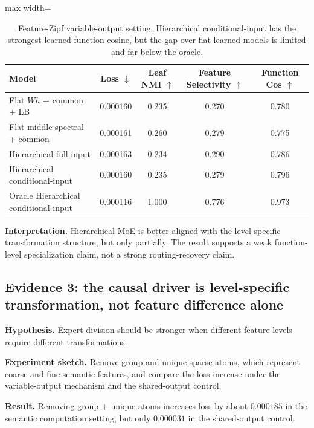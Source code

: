 \documentclass[11pt]{article}
\newcommand{\tablesize}{\footnotesize}
\begin{document}
\begin{table}[H]
\centering
\tablesize
\begin{adjustbox}{max width=\linewidth}
\begin{tabular}{lcccc}
\toprule
Model & Loss $\downarrow$ & Leaf NMI $\uparrow$ & Feature Selectivity $\uparrow$ & Function Cos $\uparrow$ \\
\midrule
Flat $Wh$ + common + LB & 0.000160 & 0.235 & 0.270 & 0.780 \\
Flat middle spectral + common & 0.000161 & 0.260 & 0.279 & 0.775 \\
Hierarchical full-input & 0.000163 & 0.234 & 0.290 & 0.786 \\
Hierarchical conditional-input & 0.000160 & 0.235 & 0.279 & 0.796 \\
Oracle Hierarchical conditional-input & 0.000116 & 1.000 & 0.776 & 0.973 \\
\bottomrule
\end{tabular}
\end{adjustbox}
\caption{Feature-Zipf variable-output setting. Hierarchical conditional-input has the strongest learned function cosine, but the gap over flat learned models is limited and far below the oracle.}
\end{table}

\textbf{Interpretation.} Hierarchical MoE is better aligned with the level-specific transformation structure, but only partially. The result supports a weak function-level specialization claim, not a strong routing-recovery claim.

\subsection{Evidence 3: the causal driver is level-specific transformation, not feature difference alone}

\textbf{Hypothesis.} Expert division should be stronger when different feature levels require different transformations.

\textbf{Experiment sketch.} Remove group and unique sparse atoms, which represent coarse and fine semantic features, and compare the loss increase under the variable-output mechanism and the shared-output control.

\textbf{Result.} Removing group + unique atoms increases loss by about $0.000185$ in the semantic computation setting, but only $0.000031$ in the shared-output control.
\end{document}
